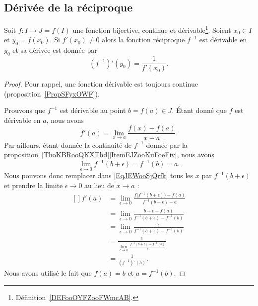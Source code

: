\subsection{Dérivée de la réciproque}

\begin{proposition} \label{PropMRBooXnnDLq}
    Soit \( f\colon I\to J=f(I)\) une fonction bijective, continue et dérivable\footnote{Définition~\ref{DEFooOYFZooFWmcAB}.}. Soient \( x_0\in I\) et \( y_0=f(x_0)\). Si \( f'(x_0)\neq 0\) alors la fonction réciproque \( f^{-1}\) est dérivable en \( y_0\) et sa dérivée est donnée par
    \begin{equation}
        (f^{-1})'(y_0)=\frac{1}{ f'(x_0) }.
    \end{equation}
\end{proposition}

\begin{proof}
    Pour rappel, une fonction dérivable est toujours continue (proposition~\ref{PropSFyxOWF}).

    Prouvons que \( f^{-1}\) est dérivable au point \( b=f(a)\in J\). Étant donné que \( f\) est dérivable en \( a\), nous avons
    \begin{equation}\label{EqJEWooSjQrfk}
        f'(a)=\lim_{x\to a} \frac{ f(x)-f(a) }{ x-a }.
    \end{equation}
    Par ailleurs, étant donnée la continuité de \( f^{-1}\) donnée par la proposition~\ref{ThoKBRooQKXThd}\ref{ItemEJZooKuFoeFiv}, nous avons
    \begin{equation}
        \lim_{\epsilon\to 0} f^{-1}(b+\epsilon)=f^{-1}(b)=a.
    \end{equation}
    Nous pouvons donc remplacer dans \eqref{EqJEWooSjQrfk} tous les \( x\) par \( f^{-1}(b+\epsilon)\) et prendre la limite \( \epsilon\to 0\) au lieu de \( x\to a\) :
    \begin{equation}
        \begin{aligned}[]
            f'(a)&=\lim_{\epsilon\to 0}\frac{ f\big( f^{-1}(b+\epsilon) \big)-f(a) }{ f^{-1}(b+\epsilon)-a }\\
            &=\lim_{\epsilon\to 0}\frac{ b+\epsilon-f(a) }{ f^{-1}(b+\epsilon)-f^{-1}(b) }\\
            &=\lim_{\epsilon\to 0}\frac{ \epsilon }{ f^{-1}(b+\epsilon)-f^{-1}(b) }\\
            &=\frac{1}{ \lim_{\epsilon\to 0}\frac{ f^{-1}(b+\epsilon)-f^{-1}(b) }{ \epsilon } }\\
            &=\frac{1}{ (f^{-1})'(b) }.
        \end{aligned}
    \end{equation}
    Nous avons utilisé le fait que \( f(a)=b\) et \( a=f^{-1}(b)\).
\end{proof}

